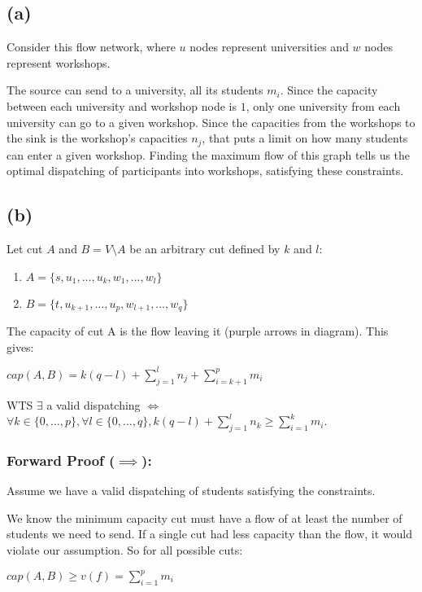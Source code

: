 \subsection*{(a)}

Consider this flow network, where $u$ nodes represent universities and $w$ nodes represent workshops.

The source can send to a university, all its students $m_i$. Since the capacity between each university and workshop node is $1$, only one university from each university can go to a given workshop. Since the capacities from the workshops to the sink is the workshop's capacities $n_j$, that puts a limit on how many students can enter a given workshop. Finding the maximum flow of this graph tells us the optimal dispatching of participants into workshops, satisfying these constraints.

\subsection*{(b)}

Let cut $A$ and $B = V \setminus A$ be an arbitrary cut defined by $k$ and $l$:
\begin{enumerate}
    \item $A = \{s, u_1, \dots, u_k, w_1, \dots, w_l\}$
    \item $B = \{t, u_{k+1}, \dots, u_p, w_{l+1}, \dots, w_q\}$
\end{enumerate}

The capacity of cut A is the flow leaving it (purple arrows in diagram). This gives:

$cap(A,B) = k(q-l) + \sum_{j=1}^{l}n_j + \sum_{i=k+1}^{p} m_i$

WTS $\exists$ a valid dispatching $\iff$ $\forall k \in \{0, \dots, p\}, \forall l \in \{0, \dots, q\}, k(q-l) + \sum_{j=1}^{l} n_k \geq \sum_{i=1}^{k} m_i$.

\subsubsection*{Forward Proof ($\implies$):}
Assume we have a valid dispatching of students satisfying the constraints.

We know the minimum capacity cut must have a flow of at least the number of students we need to send. If a single cut had less capacity than the flow, it would violate our assumption. So for all possible cuts:

$cap(A,B) \geq v(f) = \sum_{i=1}^{p} m_i$

